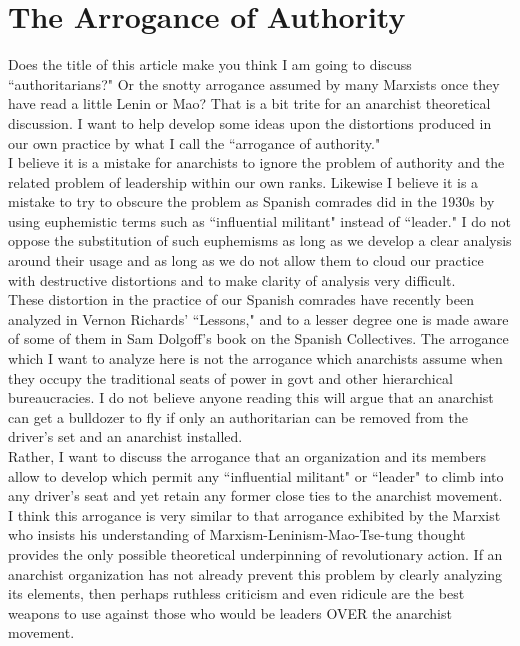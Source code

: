 \chapter{The Arrogance of Authority}

Does the title of this article make you think I am going to discuss ``authoritarians?" Or the snotty arrogance assumed by many Marxists once they have read a little Lenin or Mao? That is a bit trite for an anarchist theoretical discussion. I want to help develop some ideas upon the distortions produced in our own practice by what I call the ``arrogance of authority."\\
I believe it is a mistake for anarchists to ignore the problem of authority and the related problem of leadership within our own ranks. Likewise I believe it is a mistake to try to obscure the problem as Spanish comrades did in the 1930s by using euphemistic terms such as ``influential militant" instead of ``leader." I do not oppose the substitution of such euphemisms as long as we develop a clear analysis around their usage and as long as we do not allow them to cloud our practice with destructive distortions and to make clarity of analysis very difficult.\\
These distortion in the practice of our Spanish comrades have recently been analyzed in Vernon Richards' ``Lessons," and to a lesser degree one is made aware of some of them in Sam Dolgoff's book on the Spanish Collectives. The arrogance which I want to analyze here is not the arrogance which anarchists assume when they occupy the traditional seats of power in govt and other hierarchical bureaucracies. I do not believe anyone reading this will argue that an anarchist can get a bulldozer to fly if only an authoritarian can be removed from the driver's set and an anarchist installed.\\
Rather, I want to discuss the arrogance that an organization and its members allow to develop which permit any ``influential militant" or ``leader" to climb into any driver's seat and yet retain any former close ties to the anarchist movement. I think this arrogance is very similar to that arrogance exhibited by the Marxist who insists his understanding of Marxism-Leninism-Mao-Tse-tung thought provides the only possible theoretical underpinning of revolutionary action. If an anarchist organization has not already prevent this problem by clearly analyzing its elements, then perhaps ruthless criticism and even ridicule are the best weapons to use against those who would be leaders OVER the anarchist movement.\\
